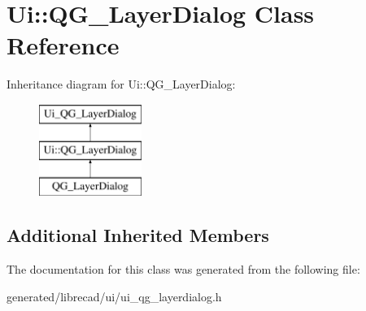 \hypertarget{classUi_1_1QG__LayerDialog}{\section{Ui\-:\-:Q\-G\-\_\-\-Layer\-Dialog Class Reference}
\label{classUi_1_1QG__LayerDialog}
}
Inheritance diagram for Ui\-:\-:Q\-G\-\_\-\-Layer\-Dialog\-:\begin{figure}[H]
\begin{center}
\leavevmode
\includegraphics[height=3.000000cm]{classUi_1_1QG__LayerDialog}
\end{center}
\end{figure}
\subsection*{Additional Inherited Members}


The documentation for this class was generated from the following file\-:\begin{DoxyCompactItemize}
\item 
generated/librecad/ui/ui\-\_\-qg\-\_\-layerdialog.\-h\end{DoxyCompactItemize}
